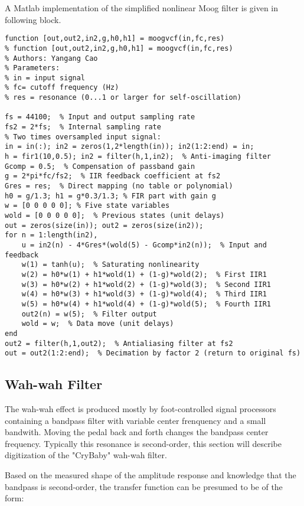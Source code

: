 \documentclass[10pt,a4paper,oneside]{article}
\begin{document}
A Matlab implementation of the simplified nonlinear Moog filter is given in following block.
\begin{lstlisting}
function [out,out2,in2,g,h0,h1] = moogvcf(in,fc,res)
% function [out,out2,in2,g,h0,h1] = moogvcf(in,fc,res)
% Authors: Yangang Cao
% Parameters:
% in = input signal
% fc= cutoff frequency (Hz)
% res = resonance (0...1 or larger for self-oscillation)

fs = 44100;  % Input and output sampling rate
fs2 = 2*fs;  % Internal sampling rate
% Two times oversampled input signal:
in = in(:); in2 = zeros(1,2*length(in)); in2(1:2:end) = in; 
h = fir1(10,0.5); in2 = filter(h,1,in2);  % Anti-imaging filter
Gcomp = 0.5;  % Compensation of passband gain
g = 2*pi*fc/fs2;  % IIR feedback coefficient at fs2
Gres = res;  % Direct mapping (no table or polynomial)
h0 = g/1.3; h1 = g*0.3/1.3; % FIR part with gain g
w = [0 0 0 0 0]; % Five state variables
wold = [0 0 0 0 0];  % Previous states (unit delays)
out = zeros(size(in)); out2 = zeros(size(in2));
for n = 1:length(in2),
	u = in2(n) - 4*Gres*(wold(5) - Gcomp*in2(n));  % Input and feedback
	w(1) = tanh(u);  % Saturating nonlinearity
	w(2) = h0*w(1) + h1*wold(1) + (1-g)*wold(2);  % First IIR1
	w(3) = h0*w(2) + h1*wold(2) + (1-g)*wold(3);  % Second IIR1
	w(4) = h0*w(3) + h1*wold(3) + (1-g)*wold(4);  % Third IIR1
	w(5) = h0*w(4) + h1*wold(4) + (1-g)*wold(5);  % Fourth IIR1
	out2(n) = w(5);  % Filter output
	wold = w;  % Data move (unit delays)
end
out2 = filter(h,1,out2);  % Antialiasing filter at fs2
out = out2(1:2:end);  % Decimation by factor 2 (return to original fs)
\end{lstlisting}
\subsection{Wah-wah Filter}
The wah-wah effect is produced mostly by foot-controlled signal processors containing a bandpass filter with variable center frenquency and a small bandwith. Moving the pedal back and forth changes the bandpass center frequency. Typically this resonance is second-order, this section will describe digitization of the "CryBaby" wah-wah filter.

Based on the measured shape of the amplitude response and knowledge that the bandpass is second-order, the transfer function can be presumed to be of the form:
\end{document}
